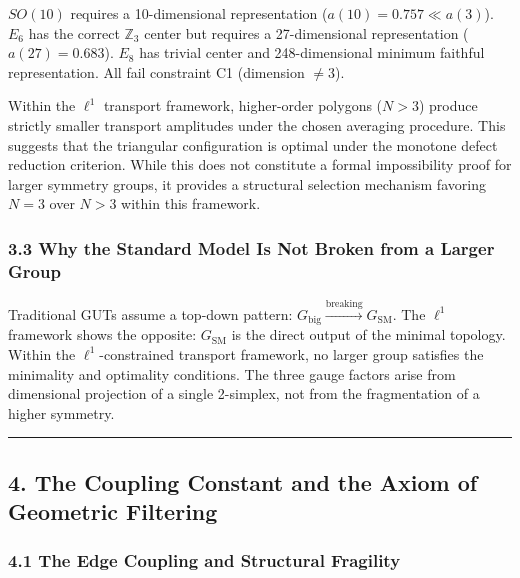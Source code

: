 \documentclass[
]{article}
\begin{document}
\(SO(10)\) requires a 10-dimensional representation
(\(a(10) = 0.757 \ll a(3)\)). \(E_6\) has the correct \(\mathbb{Z}_3\)
center but requires a 27-dimensional representation (\(a(27) = 0.683\)).
\(E_8\) has trivial center and 248-dimensional minimum faithful
representation. All fail constraint C1 (dimension \(\neq 3\)).

Within the \(\ell^1\) transport framework, higher-order polygons
(\(N > 3\)) produce strictly smaller transport amplitudes under the
chosen averaging procedure. This suggests that the triangular
configuration is optimal under the monotone defect reduction criterion.
While this does not constitute a formal impossibility proof for larger
symmetry groups, it provides a structural selection mechanism favoring
\(N = 3\) over \(N > 3\) within this framework.

\hypertarget{why-the-standard-model-is-not-broken-from-a-larger-group}{%
\subsubsection{3.3 Why the Standard Model Is Not Broken from a Larger
Group}\label{why-the-standard-model-is-not-broken-from-a-larger-group}}

Traditional GUTs assume a top-down pattern:
\(G_{\mathrm{big}} \xrightarrow{\mathrm{breaking}} G_{\mathrm{SM}}\).
The \(\ell^1\) framework shows the opposite: \(G_{\mathrm{SM}}\) is the
direct output of the minimal topology. Within the \(\ell^1\)-constrained
transport framework, no larger group satisfies the minimality and
optimality conditions. The three gauge factors arise from dimensional
projection of a single 2-simplex, not from the fragmentation of a higher
symmetry.

\begin{center}\rule{0.5\linewidth}{0.5pt}\end{center}

\hypertarget{the-coupling-constant-and-the-axiom-of-geometric-filtering}{%
\subsection{4. The Coupling Constant and the Axiom of Geometric
Filtering}\label{the-coupling-constant-and-the-axiom-of-geometric-filtering}}

\hypertarget{the-edge-coupling-and-structural-fragility}{%
\subsubsection{4.1 The Edge Coupling and Structural
Fragility}\label{the-edge-coupling-and-structural-fragility}}
\end{document}
